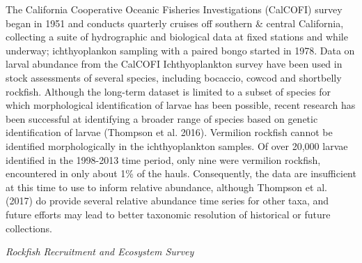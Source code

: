 \documentclass[11pt,
  english,
  a4paper,
]{article}
\begin{document}
The California Cooperative Oceanic Fisheries Investigations (CalCOFI) survey began in 1951 and conducts quarterly cruises off southern \& central California, collecting a suite of hydrographic and biological data at fixed stations and while underway; ichthyoplankon sampling with a paired bongo started in 1978. Data on larval abundance from the CalCOFI Ichthyoplankton survey have been used in stock assessments of several species, including bocaccio, cowcod and shortbelly rockfish. Although the long-term dataset is limited to a subset of species for which morphological identification of larvae has been possible, recent research has been successful at identifying a broader range of species based on genetic identification of larvae {(Thompson et al. 2016)\leavevmode\tagmcend\tagstructend}. Vermilion rockfish cannot be identified morphologically in the ichthyoplankton samples. Of over 20,000 larvae identified in the 1998-2013 time period, only nine were vermilion rockfish, encountered in only about 1\% of the hauls. Consequently, the data are insufficient at this time to use to inform relative abundance, although Thompson et al. {(2017)\leavevmode\tagmcend\tagstructend} do provide several relative abundance time series for other taxa, and future efforts may lead to better taxonomic resolution of historical or future collections.

\emph{Rockfish Recruitment and Ecosystem Survey}
\end{document}
